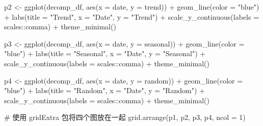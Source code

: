 \documentclass[
  letterpaper,
  DIV=11,
  numbers=noendperiod]{scrartcl}
\newenvironment{Shaded}{\begin{snugshade}}{\end{snugshade}}
\newcommand{\AttributeTok}[1]{\textcolor[rgb]{0.40,0.45,0.13}{#1}}
\newcommand{\CommentTok}[1]{\textcolor[rgb]{0.37,0.37,0.37}{#1}}
\newcommand{\DecValTok}[1]{\textcolor[rgb]{0.68,0.00,0.00}{#1}}
\newcommand{\FunctionTok}[1]{\textcolor[rgb]{0.28,0.35,0.67}{#1}}
\newcommand{\NormalTok}[1]{\textcolor[rgb]{0.00,0.23,0.31}{#1}}
\newcommand{\OtherTok}[1]{\textcolor[rgb]{0.00,0.23,0.31}{#1}}
\newcommand{\SpecialCharTok}[1]{\textcolor[rgb]{0.37,0.37,0.37}{#1}}
\newcommand{\StringTok}[1]{\textcolor[rgb]{0.13,0.47,0.30}{#1}}
\begin{document}
\begin{Shaded}
\begin{Highlighting}[]
\NormalTok{p2 }\OtherTok{\textless{}{-}} \FunctionTok{ggplot}\NormalTok{(decomp\_df, }\FunctionTok{aes}\NormalTok{(}\AttributeTok{x =}\NormalTok{ date, }\AttributeTok{y =}\NormalTok{ trend)) }\SpecialCharTok{+}
  \FunctionTok{geom\_line}\NormalTok{(}\AttributeTok{color =} \StringTok{"blue"}\NormalTok{) }\SpecialCharTok{+}
  \FunctionTok{labs}\NormalTok{(}\AttributeTok{title =} \StringTok{"Trend"}\NormalTok{, }\AttributeTok{x =} \StringTok{"Date"}\NormalTok{, }\AttributeTok{y =} \StringTok{"Trend"}\NormalTok{) }\SpecialCharTok{+}
  \FunctionTok{scale\_y\_continuous}\NormalTok{(}\AttributeTok{labels =}\NormalTok{ scales}\SpecialCharTok{::}\NormalTok{comma) }\SpecialCharTok{+}
  \FunctionTok{theme\_minimal}\NormalTok{()}

\NormalTok{p3 }\OtherTok{\textless{}{-}} \FunctionTok{ggplot}\NormalTok{(decomp\_df, }\FunctionTok{aes}\NormalTok{(}\AttributeTok{x =}\NormalTok{ date, }\AttributeTok{y =}\NormalTok{ seasonal)) }\SpecialCharTok{+}
  \FunctionTok{geom\_line}\NormalTok{(}\AttributeTok{color =} \StringTok{"blue"}\NormalTok{) }\SpecialCharTok{+}
  \FunctionTok{labs}\NormalTok{(}\AttributeTok{title =} \StringTok{"Seasonal"}\NormalTok{, }\AttributeTok{x =} \StringTok{"Date"}\NormalTok{, }\AttributeTok{y =} \StringTok{"Seasonal"}\NormalTok{) }\SpecialCharTok{+}
  \FunctionTok{scale\_y\_continuous}\NormalTok{(}\AttributeTok{labels =}\NormalTok{ scales}\SpecialCharTok{::}\NormalTok{comma) }\SpecialCharTok{+}
  \FunctionTok{theme\_minimal}\NormalTok{()}

\NormalTok{p4 }\OtherTok{\textless{}{-}} \FunctionTok{ggplot}\NormalTok{(decomp\_df, }\FunctionTok{aes}\NormalTok{(}\AttributeTok{x =}\NormalTok{ date, }\AttributeTok{y =}\NormalTok{ random)) }\SpecialCharTok{+}
  \FunctionTok{geom\_line}\NormalTok{(}\AttributeTok{color =} \StringTok{"blue"}\NormalTok{) }\SpecialCharTok{+}
  \FunctionTok{labs}\NormalTok{(}\AttributeTok{title =} \StringTok{"Random"}\NormalTok{, }\AttributeTok{x =} \StringTok{"Date"}\NormalTok{, }\AttributeTok{y =} \StringTok{"Random"}\NormalTok{) }\SpecialCharTok{+}
  \FunctionTok{scale\_y\_continuous}\NormalTok{(}\AttributeTok{labels =}\NormalTok{ scales}\SpecialCharTok{::}\NormalTok{comma) }\SpecialCharTok{+}
  \FunctionTok{theme\_minimal}\NormalTok{()}

\CommentTok{\# 使用 gridExtra 包将四个图放在一起}
\FunctionTok{grid.arrange}\NormalTok{(p1, p2, p3, p4, }\AttributeTok{ncol =} \DecValTok{1}\NormalTok{)}
\end{Highlighting}
\end{Shaded}
\end{document}
